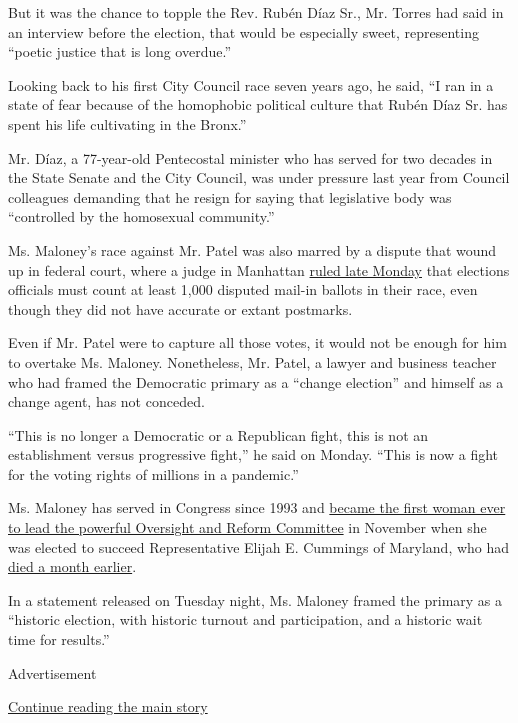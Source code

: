 But it was the chance to topple the Rev. Rubén Díaz Sr., Mr. Torres had
said in an interview before the election, that would be especially
sweet, representing ``poetic justice that is long overdue.''

Looking back to his first City Council race seven years ago, he said,
``I ran in a state of fear because of the homophobic political culture
that Rubén Díaz Sr. has spent his life cultivating in the Bronx.''

Mr. Díaz, a 77-year-old Pentecostal minister who has served for two
decades in the State Senate and the City Council, was under pressure
last year from Council colleagues demanding that he resign for saying
that legislative body was ``controlled by the homosexual community.''

Ms. Maloney's race against Mr. Patel was also marred by a dispute that
wound up in federal court, where a judge in Manhattan
\href{https://www.nytimes3xbfgragh.onion/2020/08/03/nyregion/nyc-congress-carolyn-maloney-ballots.html}{ruled
late Monday} that elections officials must count at least 1,000 disputed
mail-in ballots in their race, even though they did not have accurate or
extant postmarks.

Even if Mr. Patel were to capture all those votes, it would not be
enough for him to overtake Ms. Maloney. Nonetheless, Mr. Patel, a lawyer
and business teacher who had framed the Democratic primary as a ``change
election'' and himself as a change agent, has not conceded.

``This is no longer a Democratic or a Republican fight, this is not an
establishment versus progressive fight,'' he said on Monday. ``This is
now a fight for the voting rights of millions in a pandemic.''

Ms. Maloney has served in Congress since 1993 and
\href{https://www.nytimes3xbfgragh.onion/2019/11/20/us/politics/carolyn-maloney-oversight-committee.html}{became
the first woman ever to lead the powerful Oversight and Reform
Committee} in November when she was elected to succeed Representative
Elijah E. Cummings of Maryland, who had
\href{https://www.nytimes3xbfgragh.onion/2019/10/17/us/politics/elijah-cummings-death-illness.html}{died
a month earlier}.

In a statement released on Tuesday night, Ms. Maloney framed the primary
as a ``historic election, with historic turnout and participation, and a
historic wait time for results.''

Advertisement

\protect\hyperlink{after-bottom}{Continue reading the main story}

